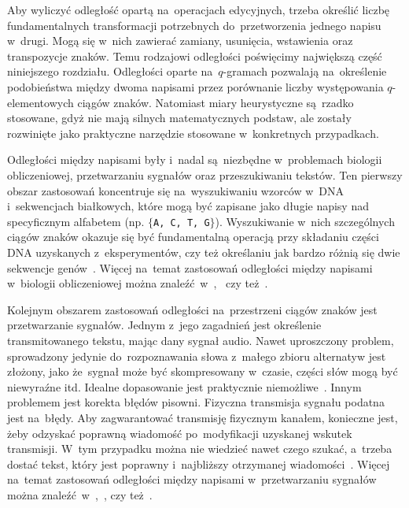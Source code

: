 \documentclass{praca1}
\begin{document}
Aby wyliczyć odległość opartą na~operacjach edycyjnych, trzeba określić liczbę fundamentalnych transformacji potrzebnych do~przetworzenia jednego napisu w~drugi. Mogą się w~nich zawierać zamiany, usunięcia, wstawienia oraz transpozycje znaków. Temu rodzajowi odległości poświęcimy największą część niniejszego rozdziału. Odległości oparte na~$q$-gramach pozwalają na~określenie podobieństwa między dwoma napisami przez porównanie liczby występowania $q$-elementowych ciągów znaków. Natomiast miary heurystyczne są~rzadko stosowane, gdyż nie mają silnych matematycznych podstaw, ale zostały rozwinięte jako praktyczne narzędzie stosowane w~konkretnych przypadkach. 

Odległości między napisami były i~nadal są~niezbędne w~problemach biologii obliczeniowej, przetwarzaniu sygnałów oraz przeszukiwaniu tekstów. Ten pierwszy obszar zastosowań koncentruje się na~wyszukiwaniu wzorców w~DNA i~sekwencjach białkowych, które mogą być zapisane jako długie napisy nad specyficznym alfabetem (np. $\{$\verb|A, C, T, G|$\}$). Wyszukiwanie w~nich szczególnych ciągów znaków okazuje się być fundamentalną operacją przy składaniu części DNA uzyskanych z~eksperymentów, czy też określaniu jak bardzo różnią się dwie sekwencje genów~\cite{Navarro2001:guidedtour}. Więcej na~temat zastosowań odległości między napisami w~biologii obliczeniowej można znaleźć~w~\cite{Sellers1980:evolutionary},~\cite{Needleman1970:proteins} czy też~\cite{Sankoff1983:timewarps}. 

Kolejnym obszarem zastosowań odległości na~przestrzeni ciągów znaków jest przetwarzanie sygnałów. Jednym z~jego zagadnień jest określenie transmitowanego tekstu, mając dany sygnał audio. Nawet uproszczony problem, sprowadzony jedynie do~rozpoznawania słowa z~małego zbioru alternatyw jest złożony, jako że~sygnał może być skompresowany w~czasie, części słów mogą być niewyraźne itd. Idealne dopasowanie jest praktycznie niemożliwe~\cite{Navarro2001:guidedtour}. Innym problemem jest korekta błędów pisowni. Fizyczna transmisja sygnału podatna jest na~błędy. Aby zagwarantować transmisję fizycznym kanałem, konieczne jest, żeby odzyskać poprawną wiadomość po~modyfikacji uzyskanej wskutek transmisji. W~tym przypadku można nie wiedzieć nawet czego szukać, a~trzeba dostać tekst, który jest poprawny i~najbliższy otrzymanej wiadomości~\cite{Navarro2001:guidedtour}. Więcej na~temat zastosowań odległości między napisami w~przetwarzaniu sygnałów można znaleźć~w~\cite{Levenshtein1965:binarycodes},~\cite{Vintsyuk1968:speech}, czy też~\cite{Dixon1979:automatic}.
\end{document}

